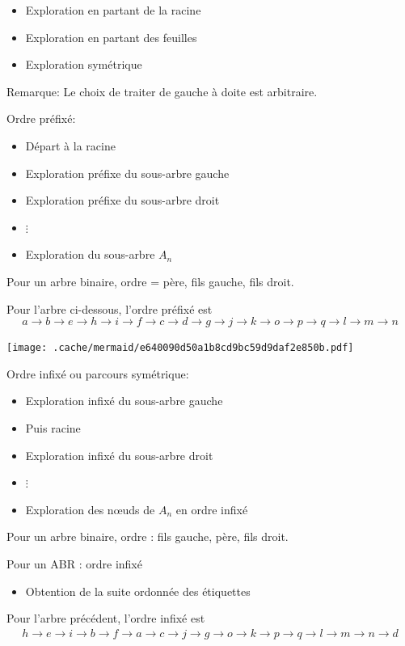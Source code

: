 \begin{itemize}
\tightlist
\item
  Exploration en partant de la racine
\item
  Exploration en partant des feuilles
\item
  Exploration symétrique
\end{itemize}

Remarque: Le choix de traiter de gauche à doite est arbitraire.

Ordre préfixé:

\begin{itemize}
\tightlist
\item
  Départ à la racine
\item
  Exploration préfixe du sous-arbre gauche
\item
  Exploration préfixe du sous-arbre droit
\item
  \(\vdots\)
\item
  Exploration du sous-arbre \(A_n\)
\end{itemize}

Pour un arbre binaire, ordre = père, fils gauche, fils droit.

Pour l'arbre ci-dessous, l'ordre préfixé est \[
a \to b \to e \to h \to i \to f \to c \to d \to g \to j \to k \to o \to p \to q \to l \to m \to n
\]

\texttt{[image: .cache/mermaid/e640090d50a1b8cd9bc59d9daf2e850b.pdf]}

Ordre infixé ou parcours symétrique:

\begin{itemize}
\tightlist
\item
  Exploration infixé du sous-arbre gauche
\item
  Puis racine
\item
  Exploration infixé du sous-arbre droit
\item
  \(\vdots\)
\item
  Exploration des nœuds de \(A_n\) en ordre infixé
\end{itemize}

Pour un arbre binaire, ordre : fils gauche, père, fils droit.

Pour un ABR : ordre infixé

\begin{itemize}
\tightlist
\item
  Obtention de la suite ordonnée des étiquettes
\end{itemize}

Pour l'arbre précédent, l'ordre infixé est \begin{align*}
h \to e \to i \to b \to f \to a \to c \to j \to g \to o \to k \to p \to q \to l \to m \to n \to d
\end{align*}

